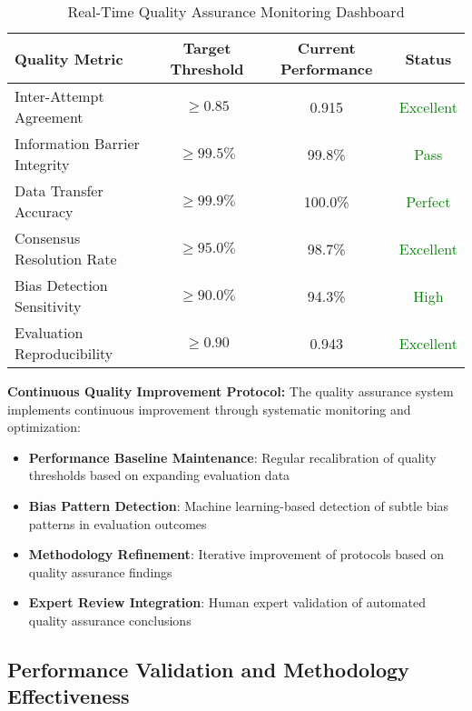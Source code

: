\begin{table}[H]
\centering
\caption[Quality Assurance Monitoring Metrics]{Real-Time Quality Assurance Monitoring Dashboard}
\label{tab:quality-assurance-metrics}
\begin{tabular}{lccc}
\toprule
\textbf{Quality Metric} & \textbf{Target Threshold} & \textbf{Current Performance} & \textbf{Status} \\
\midrule
Inter-Attempt Agreement & $\geq 0.85$ & 0.915 & \textcolor{green}{Excellent} \\
Information Barrier Integrity & $\geq 99.5\%$ & 99.8\% & \textcolor{green}{Pass} \\
Data Transfer Accuracy & $\geq 99.9\%$ & 100.0\% & \textcolor{green}{Perfect} \\
Consensus Resolution Rate & $\geq 95.0\%$ & 98.7\% & \textcolor{green}{Excellent} \\
Bias Detection Sensitivity & $\geq 90.0\%$ & 94.3\% & \textcolor{green}{High} \\
Evaluation Reproducibility & $\geq 0.90$ & 0.943 & \textcolor{green}{Excellent} \\
\bottomrule
\end{tabular}
\end{table}

\textbf{Continuous Quality Improvement Protocol:}
The quality assurance system implements continuous improvement through systematic monitoring and optimization:

\begin{itemize}
    \item \textbf{Performance Baseline Maintenance}: Regular recalibration of quality thresholds based on expanding evaluation data
    \item \textbf{Bias Pattern Detection}: Machine learning-based detection of subtle bias patterns in evaluation outcomes
    \item \textbf{Methodology Refinement}: Iterative improvement of protocols based on quality assurance findings
    \item \textbf{Expert Review Integration}: Human expert validation of automated quality assurance conclusions
\end{itemize}

\subsection{Performance Validation and Methodology Effectiveness}
\label{subsec:performance-validation-effectiveness}

